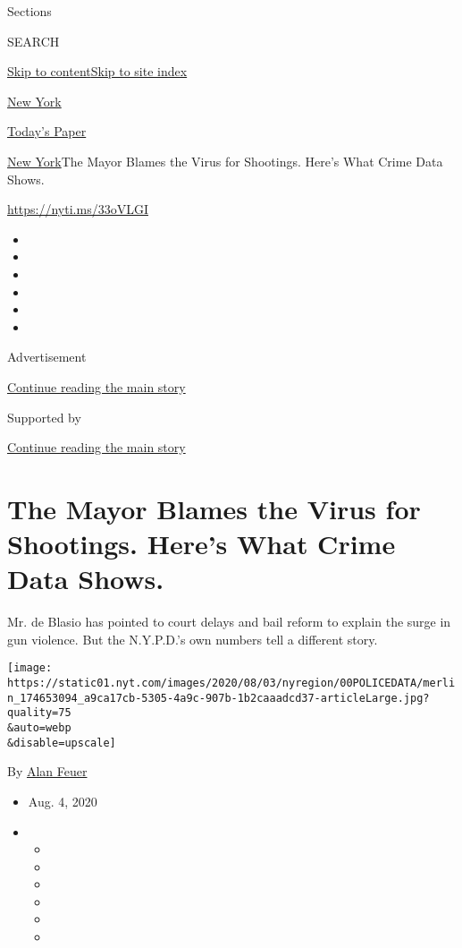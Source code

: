 Sections

SEARCH

\protect\hyperlink{site-content}{Skip to
content}\protect\hyperlink{site-index}{Skip to site index}

\href{https://www.nytimes.com/section/nyregion}{New York}

\href{https://myaccount.nytimes.com/auth/login?response_type=cookie\&client_id=vi}{}

\href{https://www.nytimes.com/section/todayspaper}{Today's Paper}

\href{/section/nyregion}{New York}\textbar{}The Mayor Blames the Virus
for Shootings. Here's What Crime Data Shows.

\url{https://nyti.ms/33oVLGI}

\begin{itemize}
\item
\item
\item
\item
\item
\item
\end{itemize}

Advertisement

\protect\hyperlink{after-top}{Continue reading the main story}

Supported by

\protect\hyperlink{after-sponsor}{Continue reading the main story}

\hypertarget{the-mayor-blames-the-virus-for-shootings-heres-what-crime-data-shows}{%
\section{The Mayor Blames the Virus for Shootings. Here's What Crime
Data
Shows.}\label{the-mayor-blames-the-virus-for-shootings-heres-what-crime-data-shows}}

Mr. de Blasio has pointed to court delays and bail reform to explain the
surge in gun violence. But the N.Y.P.D.'s own numbers tell a different
story.

\texttt{[image: https://static01.nyt.com/images/2020/08/03/nyregion/00POLICEDATA/merlin\_174653094\_a9ca17cb-5305-4a9c-907b-1b2caaadcd37-articleLarge.jpg?quality=75\\\&auto=webp\\\&disable=upscale]}

By \href{https://www.nytimes.com/by/alan-feuer}{Alan Feuer}

\begin{itemize}
\item
  Aug. 4, 2020
\item
  \begin{itemize}
  \item
  \item
  \item
  \item
  \item
  \item
  \end{itemize}
\end{itemize}

